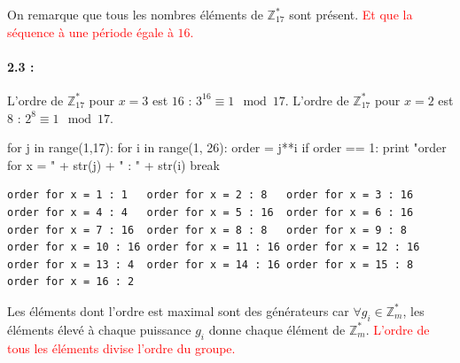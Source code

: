 \documentclass[11pt,a4paper]{report}
\begin{document}
On remarque que tous les nombres éléments de $\mathbb{Z}^*_{17}$ sont présent. \textcolor{red}{Et que la séquence à une période égale à $16$.}

\paragraph*{2.3 : } L'ordre de $\mathbb{Z}^*_{17}$ pour $x=3$ est $16$ : $3^16 \equiv 1 \mod 17$. L'ordre de $\mathbb{Z}^*_{17}$ pour $x=2$ est $8$ : $2^8 \equiv 1 \mod 17$.

\begin{pythoncode}
for j in range(1,17):
    for i in range(1, 26):
        order = j**i %
        if order == 1:
            print "order for x = " + str(j) + " : " + str(i)
            break
\end{pythoncode}

\begin{verbatim}
order for x = 1 : 1   order for x = 2 : 8   order for x = 3 : 16
order for x = 4 : 4   order for x = 5 : 16  order for x = 6 : 16 
order for x = 7 : 16  order for x = 8 : 8   order for x = 9 : 8 
order for x = 10 : 16 order for x = 11 : 16 order for x = 12 : 16
order for x = 13 : 4  order for x = 14 : 16 order for x = 15 : 8
order for x = 16 : 2
\end{verbatim}

Les éléments dont l'ordre est maximal sont des générateurs car $\forall g_i \in \mathbb{Z}^*_m$, les éléments élevé à chaque puissance $g_i$ donne chaque élément de $\mathbb{Z}^*_m$. \textcolor{red}{L'ordre de tous les éléments divise l'ordre du groupe.}
\end{document}
